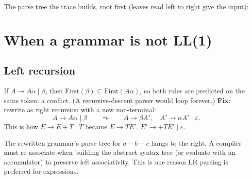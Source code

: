 The parse tree the trace builds, root first (leaves read left to right give the input):
\begin{center}
\end{center}

\section{When a grammar is not LL(1)}

\subsection{Left recursion}
If $A \to A\alpha \mid \beta$, then $\mathrm{First}(\beta) \subseteq \mathrm{First}(A\alpha)$,
so both rules are predicted on the same token: a conflict. (A recursive-descent parser would
loop forever.) \textbf{Fix}: rewrite as right recursion with a new non-terminal:
\[
A \to A\alpha \mid \beta \qquad\leadsto\qquad A \to \beta A', \quad A' \to \alpha A' \mid \varepsilon.
\]
This is how $E \to E + T \mid T$ became $E\to TE'$, $E' \to +TE' \mid \varepsilon$.

\begin{important}
The rewritten grammar's parse tree for $a-b-c$ hangs to the right. A compiler must
re-associate when building the abstract syntax tree (or evaluate with an accumulator) to
preserve left associativity. This is one reason LR parsing is preferred for expressions.
\end{important}


